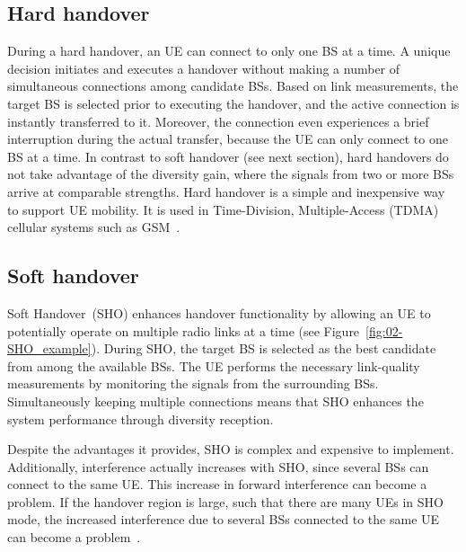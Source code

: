 \subsection{Hard handover}

During a hard handover, an UE can connect to only one BS at a time.
A unique decision initiates and executes a handover without making
a number of simultaneous connections among candidate BSs. Based on
link measurements, the target BS is selected prior to executing the
handover, and the active connection is instantly transferred to it.
Moreover, the connection even experiences a brief interruption during
the actual transfer, because the UE can only connect to one BS at
a time. In contrast to soft handover (see next section), hard handovers
do not take advantage of the diversity gain, where the signals from
two or more BSs arrive at comparable strengths. Hard handover is a
simple and inexpensive way to support UE mobility. It is used in Time-Division,
Multiple-Access (TDMA)
cellular systems such as GSM~\cite{Stuber-Principles_of_mobile_communication:2011}.


\subsection{Soft handover}

Soft Handover~(SHO) enhances
handover functionality by allowing an UE to potentially operate on
multiple radio links at a time (see Figure~\ref{fig:02-SHO_example}).
During SHO, the target BS is selected as the best candidate from among
the available BSs. The UE performs the necessary link-quality measurements
by monitoring the signals from the surrounding BSs. Simultaneously
keeping multiple connections means that SHO enhances the system performance
through diversity reception.

Despite the advantages it provides, SHO is complex and expensive to
implement. Additionally, interference actually increases with SHO,
since several BSs can connect to the same UE. This increase in forward
interference can become a problem. If the handover region is large,
such that there are many UEs in SHO mode, the increased interference
due to several BSs connected to the same UE can become a problem~\cite{Stuber-Principles_of_mobile_communication:2011}.

